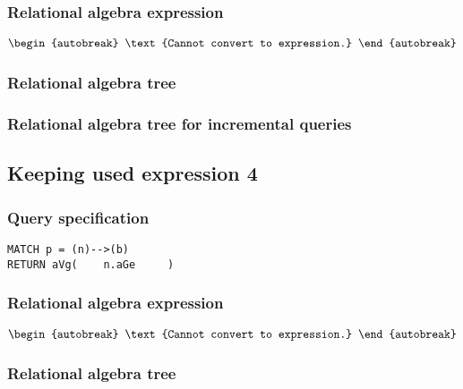 \subsubsection*{Relational algebra expression}

\begin{align*}
\begin{autobreak}
\text{Cannot convert to expression.}
\end{autobreak}
\end{align*}

\subsubsection*{Relational algebra tree}


\subsubsection*{Relational algebra tree for incremental queries}


\subsection{Keeping used expression 4}

\subsubsection*{Query specification}

\begin{lstlisting}
MATCH p = (n)-->(b)
RETURN aVg(    n.aGe     )
\end{lstlisting}

\subsubsection*{Relational algebra expression}

\begin{align*}
\begin{autobreak}
\text{Cannot convert to expression.}
\end{autobreak}
\end{align*}

\subsubsection*{Relational algebra tree}

